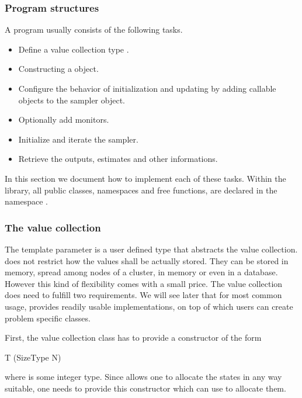 \subsubsection{Program structures}
\label{ssub:Program structures}

A \vsmc program usually consists of the following tasks.
\begin{itemize}
  \item Define a value collection type .
  \item Constructing a  object.
  \item Configure the behavior of initialization and updating by adding
    callable objects to the sampler object.
  \item Optionally add monitors.
  \item Initialize and iterate the sampler.
  \item Retrieve the outputs, estimates and other informations.
\end{itemize}
In this section we document how to implement each of these tasks. Within the
\vsmc library, all public classes, namespaces and free functions, are declared
in the namespace .

\subsubsection{The value collection}
\label{ssub:The value collection}

The template parameter  is a user defined type that abstracts the
value collection. \vsmc does not restrict how the values shall be actually
stored. They can be stored in memory, spread among nodes of a cluster, in \gpu
memory or even in a database. However this kind of flexibility comes with a
small price. The value collection does need to fulfill two requirements. We
will see later that for most common usage, \vsmc provides readily usable
implementations, on top of which users can create problem specific classes.

First, the value collection class  has to provide a constructor of the
form
\begin{cppcode}
T (SizeType N)
\end{cppcode}
where  is some integer type. Since \vsmc allows one to allocate
the states in any way suitable, one needs to provide this constructor which
 can use to allocate them.

